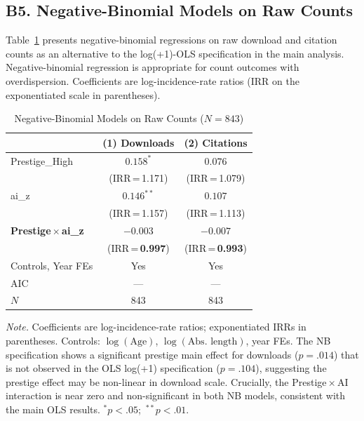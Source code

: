 \documentclass[12pt,a4paper]{article}
\begin{document}
\subsection*{B5. Negative-Binomial Models on Raw Counts}

Table~\ref{tab:nb} presents negative-binomial regressions on raw
download and citation counts as an alternative to the log(+1)-OLS
specification in the main analysis.
Negative-binomial regression is appropriate for count outcomes with
overdispersion.
Coefficients are log-incidence-rate ratios (IRR on the exponentiated
scale in parentheses).

\begin{table}[htbp]
\centering
\caption{Negative-Binomial Models on Raw Counts ($N = 843$)}
\label{tab:nb}
\begin{threeparttable}
\small
\begin{tabular}{lcc}
\toprule
 & (1) Downloads & (2) Citations \\
\midrule
Prestige\_High
  & $0.158^{*}$   & $0.076$ \\
  & (IRR\,=\,1.171) & (IRR\,=\,1.079) \\[3pt]
ai\_z
  & $0.146^{**}$   & $0.107$ \\
  & (IRR\,=\,1.157) & (IRR\,=\,1.113) \\[3pt]
\textbf{Prestige\,$\times$\,ai\_z}
  & $\mathbf{-0.003}$ & $\mathbf{-0.007}$ \\
  & (IRR\,=\,\textbf{0.997}) & (IRR\,=\,\textbf{0.993}) \\[3pt]
\midrule
Controls, Year FEs & Yes & Yes \\
AIC & --- & --- \\
$N$  & 843 & 843 \\
\bottomrule
\end{tabular}
\begin{tablenotes}
\footnotesize
\item \textit{Note.} Coefficients are log-incidence-rate ratios;
  exponentiated IRRs in parentheses.
  Controls: $\log(\text{Age})$, $\log(\text{Abs.\ length})$, year FEs.
  The NB specification shows a significant prestige main effect for
  downloads ($p = .014$) that is not observed in the OLS log(+1)
  specification ($p = .104$), suggesting the prestige effect may be
  non-linear in download scale.
  Crucially, the Prestige\,$\times$\,AI interaction is near zero and
  non-significant in both NB models, consistent with the main OLS results.
  $^{*}p<.05$;\ $^{**}p<.01$.
\end{tablenotes}
\end{threeparttable}
\end{table}
\end{document}
